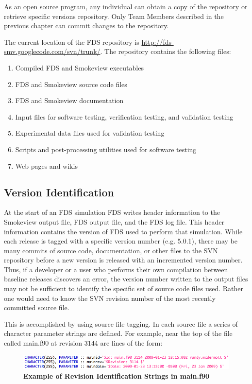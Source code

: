 \documentclass[11pt]{book}
\begin{document}
As an open source program, any individual can obtain a copy of the repository or retrieve specific versions
repository.  Only Team Members described in the previous chapter can commit changes to the repository.

The current location of the FDS repository is \href{http://fds-smv.googlecode.com/svn/trunk/}
{{\ct http://fds-smv.googlecode.com/svn/trunk/}}. The repository contains the following files:
\begin{enumerate}
\item Compiled FDS and Smokeview executables
\item FDS and Smokeview source code files
\item FDS and Smokeview documentation
\item Input files for software testing, verification testing, and validation testing
\item Experimental data files used for validation testing
\item Scripts and post-processing utilities used for software testing
\item Web pages and wikis
\end{enumerate}

\subsection{Version Identification}

At the start of an FDS simulation FDS writes header information to the Smokeview output file, FDS output file,
and the FDS log file.  This header information contains the version of FDS used to perform that simulation.
While each release is tagged with a specific version number (e.g. 5.0.1), there may be many commits of source
code, documentation, or other files to the SVN repository before a new version is released with an incremented
version number.  Thus, if a developer or a user who performs their own compilation between baseline releases
discovers an error, the version number written to the output files may not be sufficient to identify the
specific set of source code files used.  Rather one would need to know the SVN revision number of the most
recently committed source file.

This is accomplished by using source file tagging.  In each source file a series of character parameter
strings are defined.  For example, near the top of the file called main.f90 at revision 3144 are lines of the form:

\begin{figure}[ht!]
\includegraphics[width=\textwidth]{FIGURES/RevisionStrings.jpg}
\caption{\bf Example of Revision Identification Strings in main.f90}
\label{fig:revstrings}
\end{figure}
\end{document}
